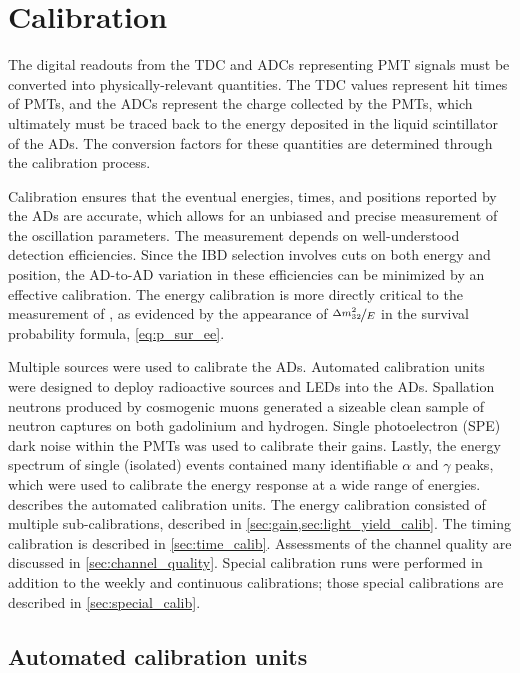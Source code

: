 \chapter{Calibration}
\label{ch:calibration}


The digital readouts from the TDC and ADCs representing PMT signals
must be converted into physically-relevant quantities.
The TDC values represent hit times of PMTs,
and the ADCs represent the charge collected by the PMTs,
which ultimately must be traced back to the energy deposited
in the liquid scintillator of the ADs.
The conversion factors for these quantities are determined
through the calibration process.

Calibration ensures that the eventual energies, times, and positions
reported by the ADs are accurate,
which allows for an unbiased and precise measurement
of the oscillation parameters.
The \thetaot{} measurement depends on well-understood detection efficiencies.
Since the IBD selection involves cuts on both energy and position,
the AD-to-AD variation in these efficiencies can be minimized
by an effective calibration.
The energy calibration is more directly critical to the measurement
of \dmsquared{}, as evidenced by the appearance of $\nicefrac{\Delta m^2_{32}}{E}$
in the survival probability formula, \cref{eq:p_sur_ee}.

Multiple sources were used to calibrate the ADs.
Automated calibration units were designed to deploy radioactive sources
and LEDs into the ADs.
Spallation neutrons produced by cosmogenic muons
generated a sizeable clean sample of neutron captures
on both gadolinium and hydrogen.
Single photoelectron (SPE) dark noise within the PMTs
was used to calibrate their gains.
Lastly, the energy spectrum of single (isolated) events
contained many identifiable $\alpha$ and $\gamma$ peaks,
which were used to calibrate the energy response at a wide range of energies.
 describes the automated calibration units.
The energy calibration consisted of multiple sub-calibrations,
described in \cref{sec:gain,sec:light_yield_calib}.
The timing calibration is described in \cref{sec:time_calib}.
Assessments of the channel quality are discussed in \cref{sec:channel_quality}.
Special calibration runs were performed in addition to
the weekly and continuous calibrations;
those special calibrations are described in \cref{sec:special_calib}.

\section{Automated calibration units}
\label{sec:acus}

